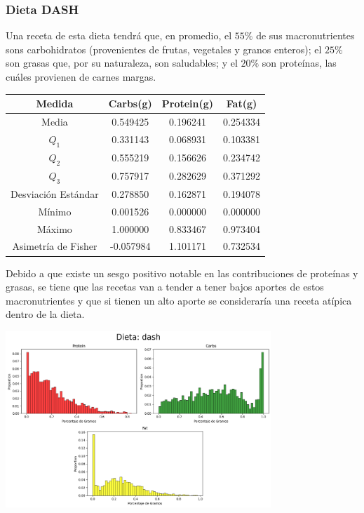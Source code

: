 \documentclass[12pt,a4paper]{article}
\begin{document}
    \subsubsection{Dieta DASH}
        Una receta de esta dieta tendrá que, en promedio, el $55\%$ de sus 
        macronutrientes sons carbohidratos (provenientes de frutas, vegetales 
        y granos enteros); el $25\%$ son grasas que, por su naturaleza, son 
        saludables; y el $20\%$ son proteínas, las cuáles provienen de carnes margas.
        \begin{center}
            \begin{tabular}{|c|ccc|}
                \hline
                Medida & Carbs(g) & Protein(g) & Fat(g) \\
                \hline
                Media               & 0.549425 & 0.196241 & 0.254334  \\
                $Q_1$               & 0.331143 & 0.068931 & 0.103381  \\
                $Q_2$               & 0.555219 & 0.156626 & 0.234742  \\
                $Q_3$               & 0.757917 & 0.282629 &	0.371292  \\
                Desviación Estándar & 0.278850 & 0.162871 & 0.194078  \\
                Mínimo              & 0.001526 & 0.000000 & 0.000000  \\
                Máximo              & 1.000000 & 0.833467 & 0.973404  \\
                Asimetría de Fisher & -0.057984 & 1.101171 & 0.732534  \\
                \hline
            \end{tabular}
        \end{center}
        Debido a que existe un sesgo positivo notable en las contribuciones de 
        proteínas y grasas, se tiene que las recetas van a tender a tener bajos 
        aportes de estos macronutrientes y que si tienen un alto aporte se 
        consideraría una receta atípica dentro de la dieta.
        \begin{center}
            \includegraphics[width=0.75\textwidth]{Resources/2_03_plot_01.png}
        \end{center}
\end{document}
